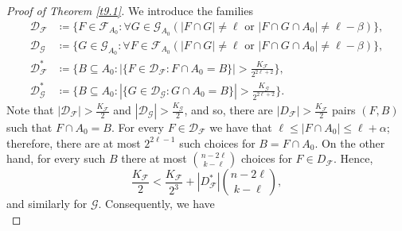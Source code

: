 \documentclass[10pt,a4paper]{amsart}
\theoremstyle{remark}
\newcommand{\mik}{\leqslant}
\newcommand{\Fcal}{\mathcal{F}}
\newcommand{\Gcal}{\mathcal{G}}
\newcommand{\Dcal}{\mathcal{D}}
\begin{document}
\begin{proof}[Proof of Theorem \emph{\ref{t9.1}}]
We introduce the families
\begin{align*}
\Dcal_{\Fcal} & \coloneqq \big\{F\in\Fcal_{A_0}: \forall G\in\Gcal_{A_0}
\left(|F\cap G|\neq \ell \text{ or } |F\cap G\cap A_0|\neq \ell-\beta\right)\big\}, \\
\Dcal_{\Gcal} & \coloneqq \big\{G\in\Gcal_{A_0}: \forall F\in\Fcal_{A_0}
\left(|F\cap G|\neq \ell \text{ or } |F\cap G\cap A_0|\neq \ell-\beta\right)\big\}, \\
\Dcal_{\Fcal}^* & \coloneqq \Big\{B\subseteq A_0:
|\{F\in\Dcal_{\Fcal}:F\cap A_0=B\}|>\frac{K_{\Fcal}}{2^{2\ell+2}}\Big\}, \\
\Dcal_{\Gcal}^* & \coloneqq \Big\{B\subseteq A_0:
|\{G\in\Dcal_{\Gcal}: G\cap A_0=B\}|>\frac{K_{\Gcal}}{2^{2\ell+2}}\Big\}.
\end{align*}
Note that $|\Dcal_{\Fcal}|>\frac{K_{\Fcal}}{2}$ and $|\Dcal_{\Gcal}|>\frac{K_{\Gcal}}{2}$, and so,
there are $|D_{\Fcal}|>\frac{K_{\Fcal}}{2}$ pairs $(F,B)$ such that $F\cap A_0=B$.
For every $F\in\Dcal_{\Fcal}$ we have that $\ell \mik |F\cap A_0|\mik \ell+\alpha$; therefore,
there are at most $2^{2\ell-1}$ such choices for $B=F\cap A_0$. On the other hand,
for every such $B$ there at most $\binom{n-2\ell}{k-\ell}$ choices for $F\in D_{\Fcal}$. Hence,
\begin{equation}
\frac{K_{\Fcal}}{2}< \frac{K_{\Fcal}}{2^3}+|D_{\Fcal}^*|\binom{n-2\ell}{k-\ell},
\end{equation}
and similarly for $\mathcal{G}$. Consequently, we have
\begin{equation} \label{e9.18}

\end{equation}
\end{proof}
\end{document}
